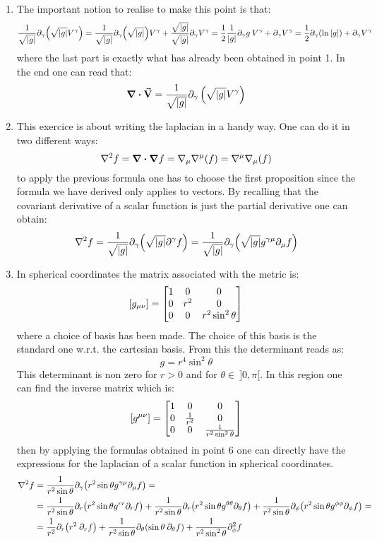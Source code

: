 \documentclass[11pt, oneside]{article}
\begin{document}
\begin{enumerate}
\item The important notion to realise to make this point is that:
\[
	\frac{1}{\sqrt{\abs{g}}} \partial_\gamma \qty(\sqrt{\abs{g}}V^\gamma) = \frac{1}{\sqrt{\abs{g}}} \partial_\gamma \qty(\sqrt{\abs{g}}) V^\gamma + \frac{\sqrt{\abs{g}}}{\sqrt{\abs{g}}} \partial_\gamma V^\gamma = \frac{1}{2} \frac{1}{\abs{g}} \partial_\gamma g \: V^\gamma + \partial_\gamma V^\gamma = \frac{1}{2} \partial_{\gamma}\qty( \ln \abs{g}) + \partial_\gamma V^\gamma
\]
where the last part is exactly what has already been obtained in point 1. In the end one can read that:
\[
	\div \va{V}=\frac{1}{\sqrt{|g|}} \partial_{\gamma}\left(\sqrt{|g|} V^{\gamma}\right)
\]

\item This exercice is about writing the laplacian in a handy way. One can do it in two different ways:
\[
	\laplacian f = \div \grad f = \nabla_\mu \nabla^\mu \qty(f) = \nabla^\mu \nabla_\mu \qty(f)
\]
to apply the previous formula one has to choose the first proposition since the formula we have derived only applies to vectors. By recalling that the covariant derivative of a scalar function is just the partial derivative one can obtain:
\[
	\laplacian f = \frac{1}{\sqrt{|g|}} \partial_{\gamma}\qty(\sqrt{|g|} \partial^\gamma f) = \frac{1}{\sqrt{|g|}} \partial_{\gamma}\qty(\sqrt{|g|} g^{\gamma\mu}\partial_\mu f)
\]

\item In spherical coordinates the matrix associated with the metric is:
\[
	\qty[g_{\mu\nu}] = 
	\begin{bmatrix} 
	1 & 0 & 0 \\
	0 & r^2 & 0 \\
	0 & 0 & r^2 \sin^2 \theta
	\end{bmatrix}
\]
where a choice of basis has been made. The choice of this basis is the standard one w.r.t. the cartesian basis. From this the determinant reads as:
\[
	g = r^4 \sin^2 \theta
\]
This determinant is non zero for $r>0$ and for $\theta \in \:]0, \pi[$. In this region one can find the inverse matrix which is:
\[
	\qty[g^{\mu\nu}] = 
	\begin{bmatrix} 
	1 & 0 & 0 \\
	0 & \frac{1}{r^2} & 0 \\
	0 & 0 & \frac{1}{r^2 \sin^2 \theta}
	\end{bmatrix}
\]
then by applying the formulas obtained in point 6 one can directly have the expressions for the laplacian of a scalar function in spherical coordinates.
\begin{align*}
	\laplacian f &= \frac{1}{r^2\sin\theta} \partial_\gamma\qty( r^2\sin\theta  g^{\gamma\mu}\partial_\mu f) = \\
	&= \frac{1}{r^2\sin\theta} \partial_r \qty(r^2\sin\theta g^{rr} \partial_r f) + \frac{1}{r^2\sin\theta} \partial_r \qty(r^2\sin\theta g^{\theta\theta} \partial_\theta f) + \frac{1}{r^2\sin\theta} \partial_\phi \qty(r^2\sin\theta g^{\phi\phi} \partial_\phi f) = \\
	&= \frac{1}{r^2} \partial_r \qty( r^2 \:\partial_r f ) + \frac{1}{r^2 \sin\theta} \partial_\theta \qty( \sin\theta \:\partial_\theta f ) + \frac{1}{r^2\sin^2\theta}\partial_\phi^2 f
\end{align*}


\end{enumerate}
\end{document}
